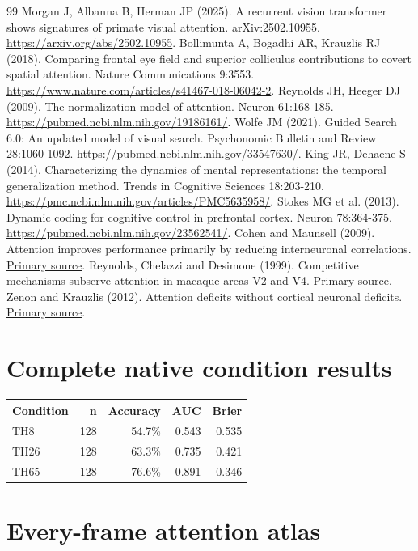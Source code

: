 \documentclass[11pt]{article}
\begin{document}
\begin{thebibliography}{99}
 Morgan J, Albanna B, Herman JP (2025). A recurrent vision transformer shows signatures of primate visual attention. arXiv:2502.10955. \url{https://arxiv.org/abs/2502.10955}.
 Bollimunta A, Bogadhi AR, Krauzlis RJ (2018). Comparing frontal eye field and superior colliculus contributions to covert spatial attention. Nature Communications 9:3553. \url{https://www.nature.com/articles/s41467-018-06042-2}.
 Reynolds JH, Heeger DJ (2009). The normalization model of attention. Neuron 61:168-185. \url{https://pubmed.ncbi.nlm.nih.gov/19186161/}.
 Wolfe JM (2021). Guided Search 6.0: An updated model of visual search. Psychonomic Bulletin and Review 28:1060-1092. \url{https://pubmed.ncbi.nlm.nih.gov/33547630/}.
 King JR, Dehaene S (2014). Characterizing the dynamics of mental representations: the temporal generalization method. Trends in Cognitive Sciences 18:203-210. \url{https://pmc.ncbi.nlm.nih.gov/articles/PMC5635958/}.
 Stokes MG et al. (2013). Dynamic coding for cognitive control in prefrontal cortex. Neuron 78:364-375. \url{https://pubmed.ncbi.nlm.nih.gov/23562541/}.
 Cohen and Maunsell (2009). Attention improves performance primarily by reducing interneuronal correlations. \href{https://pubmed.ncbi.nlm.nih.gov/19915566/}{Primary source}.
 Reynolds, Chelazzi and Desimone (1999). Competitive mechanisms subserve attention in macaque areas V2 and V4. \href{https://pubmed.ncbi.nlm.nih.gov/10024360/}{Primary source}.
 Zenon and Krauzlis (2012). Attention deficits without cortical neuronal deficits. \href{https://pubmed.ncbi.nlm.nih.gov/22972195/}{Primary source}.
\end{thebibliography}\clearpage\appendix\section{Complete native condition results}
\small\begin{longtable}{p{}rrrr}\toprule Condition & n & Accuracy & AUC & Brier\\\midrule\endhead
TH8 & 128 & 54.7\% & 0.543 & 0.535\\
TH26 & 128 & 63.3\% & 0.735 & 0.421\\
TH65 & 128 & 76.6\% & 0.891 & 0.346\\
\bottomrule\end{longtable}\normalsize\section{Every-frame attention atlas}
\end{document}
